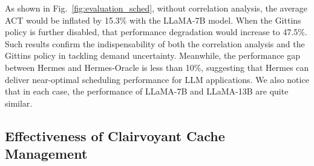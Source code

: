 As shown in Fig.~\ref{fig:evaluation_sched}, without correlation analysis, the average ACT would be inflated by 15.3\% with the LLaMA-7B model. 
When the Gittins policy is further disabled, that performance degradation would increase to 47.5\%.
Such results confirm the indispensability of both the correlation analysis and the Gittins policy in tackling demand uncertainty.
Meanwhile, the performance gap between Hermes and Hermes-Oracle is less than 10\%, suggesting that Hermes can deliver near-optimal scheduling performance for LLM applications. %
We also notice that in each case, the performance of LLaMA-7B and LLaMA-13B are quite similar.




\subsection{Effectiveness of Clairvoyant Cache Management}



